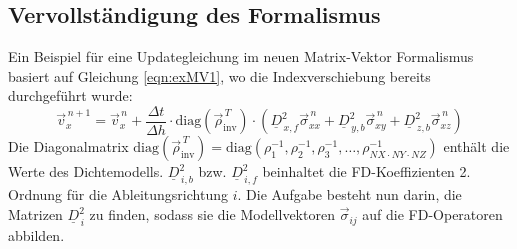 \documentclass[pdftex,a4paper,parskip,listof=totoc,bibliography=totoc,onehalfspacing,12pt]{scrreprt}
\begin{document}
\subsection{Vervollständigung des Formalismus}

Ein Beispiel für eine Updategleichung im neuen Matrix-Vektor Formalismus basiert auf Gleichung \ref{eqn:exMV1}, wo die Indexverschiebung bereits durchgeführt wurde:
\begin{equation}
	\vec{v}_x^{\,n+1} = \vec{v}_x^{\,n} + \frac{\Delta t}{\Delta h} \cdot \mathrm{diag} \left( \vec{\rho}_\mathrm{inv}^{\,T} \right) \cdot \left( \underline{D}_{\,x,f}^2 \vec{\sigma}_{xx}^{\,n} + \underline{D}_{\,y,b}^2 \vec{\sigma}_{xy}^{\,n} + \underline{D}_{\,z,b}^2 \vec{\sigma}_{xz}^{\,n} \right)\label{eqn:exMV2}
\end{equation}
Die Diagonalmatrix $\mathrm{diag} \left( \vec{\rho}_\mathrm{inv}^{\,T} \right) = \mathrm{diag} \left( \rho_1^{-1}, \rho_2^{-1}, \rho_3^{-1}, \dots , \rho_{NX \cdot NY \cdot NZ}^{-1} \right)$ enthält die Werte des Dichtemodells. $\underline{D}_{\,i,b}^2$ bzw. $\underline{D}_{\,i,f}^2$  beinhaltet die FD-Koeffizienten 2. Ordnung für die Ableitungsrichtung $i$. Die Aufgabe besteht nun darin, die Matrizen $\underline{D}_{\,i}^2$ zu finden, sodass sie die Modellvektoren $\vec{\sigma}_{ij}$ auf die FD-Operatoren abbilden. 
\end{document}
